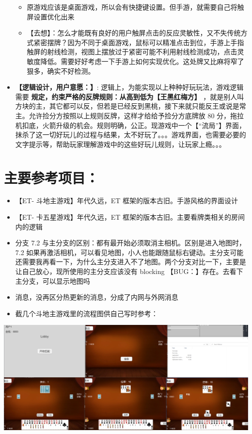 \documentclass[9pt, b5paper]{article}
\begin{document}
\begin{itemize}
\begin{itemize}
\item 原游戏应该是桌面游戏，所以会有快捷键设置。但手游，就需要自己将触屏设置优化出来
\item 【去想】：怎么才能既有良好的用户触屏点击的反应灵敏性，又不失传统方式紧密摆牌？因为不同于桌面游戏，鼠标可以精准点击到位，手游上手指触屏的射线检测，视图上摆放过于紧密可能不利用射线检测成功，点击灵敏度降低。需要好好考虑一下手游上如何实现优化。这处牌又比麻将窄了狠多，确实不好检测。
\end{itemize}
\item \textbf{【逻辑设计，用户意愿：】}: 逻辑上，为能实现以上种种好玩玩法，游戏逻辑需要 \textbf{规定，约束严格的反牌规则：从高到低为【王黑红梅方】} ，就是别人叫方块的主，其它都可以反，但若是已经反到黑桃，接下来就只能反王或说是常主。允许捡分方按照以上规则反牌，这样才给给予捡分方底牌放 80 分，拖拉机扣底，火箭升级的机会。规则明确，公正。现游戏中一个【“流局”】界面，抹杀了这一切好玩儿的过程与结果，太不好玩了。。。游戏界面，也需要必要的文字提示等，帮助玩家理解游戏中的这些好玩儿规则，让玩家上瘾。。。
\end{itemize}

\section{主要参考项目：}
\label{sec-2}
\begin{itemize}
\item 【ET- 斗地主游戏】年代久远，ET 框架的版本古旧。手游风格的界面设计
\item 【ET- 卡五星游戏】年代久远，ET 框架的版本古旧。主要看牌类相关的房间内的逻辑
\item 分支 7.2 与主分支的区别：都有最开始必须取消主相机。区别是进入地图时，7.2 如果再激活相机，可以看见地图，小人也能跟随鼠标右键动。主分支可能还需要我再看一下，为什么主分支进入不了地图。两个分支对比一下，主要是让自己放心，现所使用的主分支应该没有 blocking 【BUG：】存在。去看下主分支，可以显示地图吗
\item 消息，没再区分热更新的消息，分成了内网与外网消息
\item 截几个斗地主游戏里的流程图供自己写时参考：
\end{itemize}

\includegraphics[width=.9\linewidth]{./pic/readme_20230511_163501.png}
\end{document}
